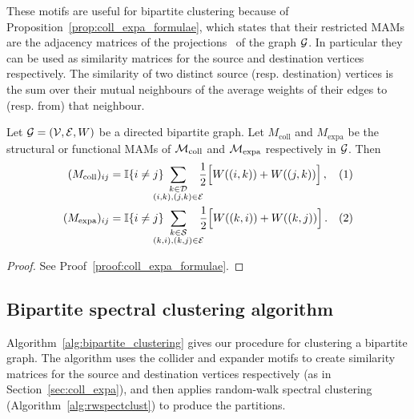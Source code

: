 These motifs are useful for bipartite clustering because of Proposition~\ref{prop:coll_expa_formulae}, which states that their restricted MAMs are the adjacency matrices of the projections~\cite{kolaczyk2014statistical} of the graph $\mathcal{G}$.
In particular they can be used as similarity matrices for the source and destination vertices respectively.
The similarity of two distinct source (resp. destination) vertices is the sum over their mutual neighbours of the average weights of their edges to (resp. from) that neighbour.

\begin{proposition} \label{prop:coll_expa_formulae}
	Let $\mathcal{G} = (\mathcal{V,E},W)$ be a directed bipartite graph. Let $M_\mathrm{coll}$ and $M_\mathrm{expa}$ be the structural or functional MAMs of $\mathcal{M}_\mathrm{coll}$ and $\mathcal{M}_\mathrm{expa}$ respectively in $\mathcal{G}$. Then
%
	\begin{align*}
		(M_\mathrm{coll})_{ij} &= \bb{I} \{i \neq j\} \hspace*{-0.4cm} \sum_{\substack{k \in \ca{D} \\ (i,k), (j,k) \in \ca{E}}} \hspace*{-0.2cm} \frac{1}{2} \Big[ W((i,k)) + W((j,k)) \Big]\,, &(1)\\
		(M_\mathrm{expa})_{ij} &= \bb{I} \{i \neq j\} \hspace*{-0.4cm} \sum_{\substack{k \in \ca{S} \\ (k,i), (k,j) \in \ca{E}}} \hspace*{-0.2cm}\frac{1}{2} \Big[ W((k,i)) + W((k,j)) \Big]\,. &(2)
	\end{align*}
%
\end{proposition}
%
\begin{proof}
See Proof~\ref{proof:coll_expa_formulae}.
\end{proof}




\subsection{Bipartite spectral clustering algorithm}

Algorithm~\ref{alg:bipartite_clustering} gives our procedure for clustering a bipartite graph. The algorithm uses the collider and expander motifs to create similarity matrices for the source and destination vertices respectively (as in Section~\ref{sec:coll_expa}), and then applies random-walk spectral clustering (Algorithm~\ref{alg:rwspectclust}) to produce the partitions.


